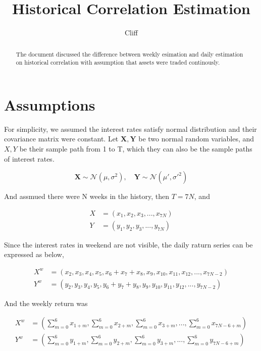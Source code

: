 \documentclass{article}[a4]
\title{Historical Correlation Estimation}
\author{Cliff}
\begin{document}
\maketitle
\begin{abstract}
	The document discussed the difference between weekly esimation and daily estimation on historical correlation with assumption that assets were traded continously.
\end{abstract}
\section{Assumptions}
For simplicity, we assumed the interest rates satisfy normal distribution and their covariance matrix were constant. Let $\mathbf{X},\mathbf{Y}$ be two normal random variables, and $X, Y$ be their sample path from 1 to T, which they can also be the sample paths of interest rates.\par 

\begin{equation}
\mathbf{X}\sim \mathcal{N}(\mu, \sigma^{2}),\quad \mathbf{Y}\sim \mathcal{N}(\mu ', \sigma'^{2})
\end{equation}\par 
And assmued there were N weeks in the history, then $T = 7N$, and\par 
\begin{equation}
\begin{aligned}
X &= (x_{1}, x_{2},x_{3},...,x_{7N})\\
Y &=(y_{1},y_{2},y_{3},...,y_{7N})
\end{aligned}
\end{equation}\par 
Since the interest rates in weekend are not visible, the daily raturn series can be expressed as below,\par 
\begin{equation}\label{daily}
\begin{aligned}
X^{w} &= (x_{2},x_{3},x_{4},x_{5},x_{6}+x_{7}+x_{8}, x_{9},x_{10}, x_{11},x_{12}, ...,x_{7N-2})\\
Y^{w} &= (y_{2},y_{3},y_{4},y_{5},y_{6}+y_{7}+y_{8}, y_{9},y_{10}, y_{11},y_{12}, ...,y_{7N-2})
\end{aligned}
\end{equation}\par 
And the weekly return was \par 
\begin{equation}\label{weekly}
\begin{aligned}
X^{w} &= (\sum_{m=0}^{6}x_{1+m}, \sum_{m=0}^{6}x_{2+m},\sum_{m=0}^{6}x_{3+m},...,\sum_{m=0}^{6}x_{7N-6+m})\\
Y^{w} &= (\sum_{m=0}^{6}y_{1+m}, \sum_{m=0}^{6}y_{2+m},\sum_{m=0}^{6}y_{3+m},...,\sum_{m=0}^{6}y_{7N-6+m})\\
\end{aligned}
\end{equation}\par 
\end{document}
